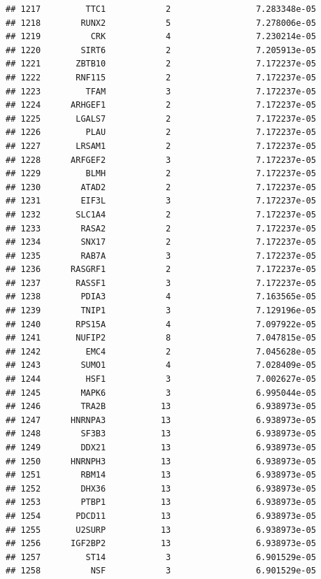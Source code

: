 \documentclass[
]{article}
\begin{document}
\begin{verbatim}
## 1217         TTC1            2                 7.283348e-05
## 1218        RUNX2            5                 7.278006e-05
## 1219          CRK            4                 7.230214e-05
## 1220        SIRT6            2                 7.205913e-05
## 1221       ZBTB10            2                 7.172237e-05
## 1222       RNF115            2                 7.172237e-05
## 1223         TFAM            3                 7.172237e-05
## 1224      ARHGEF1            2                 7.172237e-05
## 1225       LGALS7            2                 7.172237e-05
## 1226         PLAU            2                 7.172237e-05
## 1227       LRSAM1            2                 7.172237e-05
## 1228      ARFGEF2            3                 7.172237e-05
## 1229         BLMH            2                 7.172237e-05
## 1230        ATAD2            2                 7.172237e-05
## 1231        EIF3L            3                 7.172237e-05
## 1232       SLC1A4            2                 7.172237e-05
## 1233        RASA2            2                 7.172237e-05
## 1234        SNX17            2                 7.172237e-05
## 1235        RAB7A            3                 7.172237e-05
## 1236      RASGRF1            2                 7.172237e-05
## 1237       RASSF1            3                 7.172237e-05
## 1238        PDIA3            4                 7.163565e-05
## 1239        TNIP1            3                 7.129196e-05
## 1240       RPS15A            4                 7.097922e-05
## 1241       NUFIP2            8                 7.047815e-05
## 1242         EMC4            2                 7.045628e-05
## 1243        SUMO1            4                 7.028409e-05
## 1244         HSF1            3                 7.002627e-05
## 1245        MAPK6            3                 6.995044e-05
## 1246        TRA2B           13                 6.938973e-05
## 1247      HNRNPA3           13                 6.938973e-05
## 1248        SF3B3           13                 6.938973e-05
## 1249        DDX21           13                 6.938973e-05
## 1250      HNRNPH3           13                 6.938973e-05
## 1251        RBM14           13                 6.938973e-05
## 1252        DHX36           13                 6.938973e-05
## 1253        PTBP1           13                 6.938973e-05
## 1254       PDCD11           13                 6.938973e-05
## 1255       U2SURP           13                 6.938973e-05
## 1256      IGF2BP2           13                 6.938973e-05
## 1257         ST14            3                 6.901529e-05
## 1258          NSF            3                 6.901529e-05

\end{verbatim}
\end{document}
